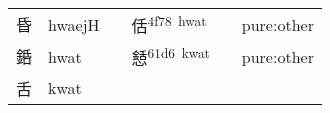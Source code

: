 \documentclass[14pt,a4paper]{scrartcl}
\begin{document}
\begin{longtable}[c]{@{}llllll@{}}
\begin{minipage}[t]{0.14\columnwidth}\raggedright\strut
昏
\strut\end{minipage} &
\begin{minipage}[t]{0.14\columnwidth}\raggedright\strut
hwaejH
\strut\end{minipage} &
\begin{minipage}[t]{0.14\columnwidth}\raggedright\strut
\strut\end{minipage} &
\begin{minipage}[t]{0.14\columnwidth}\raggedright\strut
佸\textsuperscript{4f78~hwat}
\strut\end{minipage} &
\begin{minipage}[t]{0.14\columnwidth}\raggedright\strut
\strut\end{minipage} &
\begin{minipage}[t]{0.14\columnwidth}\raggedright\strut
pure:other
\strut\end{minipage}\tabularnewline
\begin{minipage}[t]{0.14\columnwidth}\raggedright\strut
銽
\strut\end{minipage} &
\begin{minipage}[t]{0.14\columnwidth}\raggedright\strut
hwat
\strut\end{minipage} &
\begin{minipage}[t]{0.14\columnwidth}\raggedright\strut
\strut\end{minipage} &
\begin{minipage}[t]{0.14\columnwidth}\raggedright\strut
懖\textsuperscript{61d6~kwat}
\strut\end{minipage} &
\begin{minipage}[t]{0.14\columnwidth}\raggedright\strut
\strut\end{minipage} &
\begin{minipage}[t]{0.14\columnwidth}\raggedright\strut
pure:other
\strut\end{minipage}\tabularnewline
\begin{minipage}[t]{0.14\columnwidth}\raggedright\strut
舌
\strut\end{minipage} &
\begin{minipage}[t]{0.14\columnwidth}\raggedright\strut
kwat
\strut\end{minipage} &
\begin{minipage}[t]{0.14\columnwidth}\raggedright\strut
\strut\end{minipage} &
\begin{minipage}[t]{0.14\columnwidth}\raggedright\strut

\end{minipage}
\end{longtable}
\end{document}
